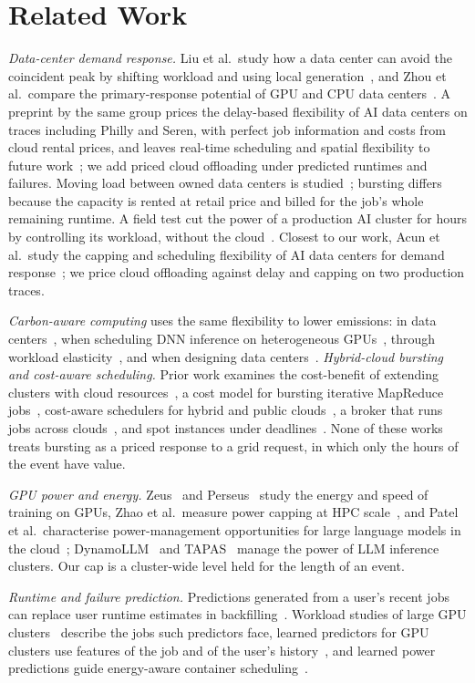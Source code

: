 \section{Related Work}
\label{sec:related}

\emph{Data-center demand response.} Liu et al.\ study how a data center can avoid the coincident peak by shifting workload and using local generation~\cite{liu13}, and Zhou et al.\ compare the primary-response potential of GPU and CPU data centers~\cite{zhou24}. A preprint by the same group prices the delay-based flexibility of AI data centers on traces including Philly and Seren, with perfect job information and costs from cloud rental prices, and leaves real-time scheduling and spatial flexibility to future work~\cite{zhou24flex}; we add priced cloud offloading under predicted runtimes and failures. Moving load between owned data centers is studied~\cite{liu11}; bursting differs because the capacity is rented at retail price and billed for the job's whole remaining runtime. A field test cut the power of a production AI cluster for hours by controlling its workload, without the cloud~\cite{colangelo26}. Closest to our work, Acun et al.\ study the capping and scheduling flexibility of AI data centers for demand response~\cite{acun26dr}; we price cloud offloading against delay and capping on two production traces.

\emph{Carbon-aware computing} uses the same flexibility to lower emissions: in data centers~\cite{radovanovic23}, when scheduling DNN inference on heterogeneous GPUs~\cite{nabavinejad25}, through workload elasticity~\cite{hanafy24}, and when designing data centers~\cite{acun23}.
\emph{Hybrid-cloud bursting and cost-aware scheduling.} Prior work examines the cost-benefit of extending clusters with cloud resources~\cite{assuncao09}, a cost model for bursting iterative MapReduce jobs~\cite{clemente17}, cost-aware schedulers for hybrid and public clouds~\cite{luo24,chang25}, a broker that runs jobs across clouds~\cite{yang23}, and spot instances under deadlines~\cite{wu24}. None of these works treats bursting as a priced response to a grid request, in which only the hours of the event have value.

\emph{GPU power and energy.} Zeus~\cite{you23} and Perseus~\cite{chung24} study the energy and speed of training on GPUs, Zhao et al.\ measure power capping at HPC scale~\cite{zhao23}, and Patel et al.\ characterise power-management opportunities for large language models in the cloud~\cite{patel24}; DynamoLLM~\cite{stojkovic25dynamo} and TAPAS~\cite{stojkovic25tapas} manage the power of LLM inference clusters. Our cap is a cluster-wide level held for the length of an event.

\emph{Runtime and failure prediction.} Predictions generated from a user's recent jobs can replace user runtime estimates in backfilling~\cite{tsafrir07}. Workload studies of large GPU clusters~\cite{jeon19,hu24,li26} describe the jobs such predictors face, learned predictors for GPU clusters use features of the job and of the user's history~\cite{hu21,hu23}, and learned power predictions guide energy-aware container scheduling~\cite{raith24}.